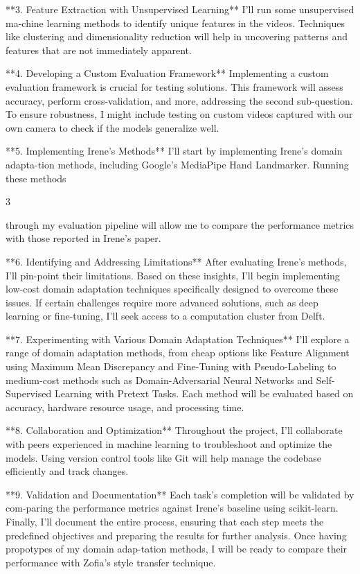 \documentclass[
]{article}
\begin{document}
**3. Feature Extraction with Unsupervised Learning** I'll run some
unsupervised ma-chine learning methods to identify unique features in
the videos. Techniques like clustering and dimensionality reduction will
help in uncovering patterns and features that are not immediately
apparent.

**4. Developing a Custom Evaluation Framework** Implementing a custom
evaluation framework is crucial for testing solutions. This framework
will assess accuracy, perform cross-validation, and more, addressing the
second sub-question. To ensure robustness, I might include testing on
custom videos captured with our own camera to check if the models
generalize well.

**5. Implementing Irene's Methods** I'll start by implementing Irene's
domain adapta-tion methods, including Google's MediaPipe Hand
Landmarker. Running these methods

3

through my evaluation pipeline will allow me to compare the performance
metrics with those reported in Irene's paper.

**6. Identifying and Addressing Limitations** After evaluating Irene's
methods, I'll pin-point their limitations. Based on these insights, I'll
begin implementing low-cost domain adaptation techniques specifically
designed to overcome these issues. If certain challenges require more
advanced solutions, such as deep learning or fine-tuning, I'll seek
access to a computation cluster from Delft.

**7. Experimenting with Various Domain Adaptation Techniques** I'll
explore a range of domain adaptation methods, from cheap options like
Feature Alignment using Maximum Mean Discrepancy and Fine-Tuning with
Pseudo-Labeling to medium-cost methods such as Domain-Adversarial Neural
Networks and Self-Supervised Learning with Pretext Tasks. Each method
will be evaluated based on accuracy, hardware resource usage, and
processing time.

**8. Collaboration and Optimization** Throughout the project, I'll
collaborate with peers experienced in machine learning to troubleshoot
and optimize the models. Using version control tools like Git will help
manage the codebase efficiently and track changes.

**9. Validation and Documentation** Each task's completion will be
validated by com-paring the performance metrics against Irene's baseline
using scikit-learn. Finally, I'll document the entire process, ensuring
that each step meets the predefined objectives and preparing the results
for further analysis. Once having propotypes of my domain adap-tation
methods, I will be ready to compare their performance with Zofia's style
transfer technique.
\end{document}
